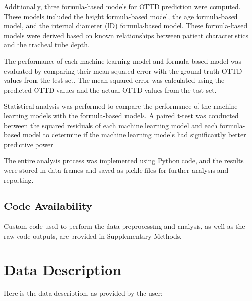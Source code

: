 \documentclass[11pt]{article}
\begin{document}
Additionally, three formula-based models for OTTD prediction were computed. These models included the height formula-based model, the age formula-based model, and the internal diameter (ID) formula-based model. These formula-based models were derived based on known relationships between patient characteristics and the tracheal tube depth.

The performance of each machine learning model and formula-based model was evaluated by comparing their mean squared error with the ground truth OTTD values from the test set. The mean squared error was calculated using the predicted OTTD values and the actual OTTD values from the test set.

Statistical analysis was performed to compare the performance of the machine learning models with the formula-based models. A paired t-test was conducted between the squared residuals of each machine learning model and each formula-based model to determine if the machine learning models had significantly better predictive power.

The entire analysis process was implemented using Python code, and the results were stored in data frames and saved as pickle files for further analysis and reporting.\subsection*{Code Availability}

Custom code used to perform the data preprocessing and analysis, as well as the raw code outputs, are provided in Supplementary Methods.


\clearpage
\appendix

\section{Data Description} \label{sec:data_description} Here is the data description, as provided by the user:
\end{document}
